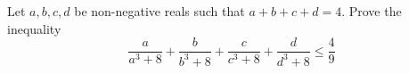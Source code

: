 Let $a,b,c,d$ be non-negative reals such that $a+b+c+d=4$. Prove the inequality\[\frac{a}{a^3+8}+\frac{b}{b^3+8}+\frac{c}{c^3+8}+\frac{d}{d^3+8}\le\frac{4}{9}\]